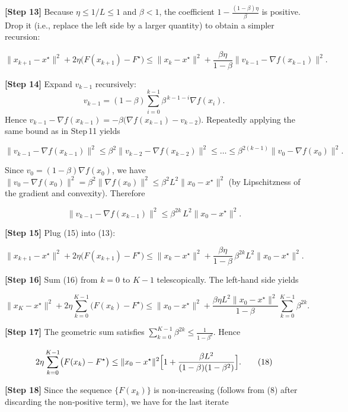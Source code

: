 \documentclass{article}
\begin{document}
\noindent\textbf{[Step 13]}  Because $\eta\le 1/L\le 1$ and $\beta<1$, the coefficient
$1-\frac{(1-\beta)\eta}{\beta}$ is positive.  Drop it (i.e., replace the left side by a larger quantity) to obtain a simpler recursion:

\[
\|x_{k+1}-x^\star\|^{2}+2\eta\bigl(F(x_{k+1})-F^\star\bigr)
\le \|x_k-x^\star\|^{2}
   +\frac{\beta\eta}{1-\beta}\|v_{k-1}-\nabla f(x_{k-1})\|^{2}.
\tag{13}
\]

\noindent\textbf{[Step 14]}  Expand $v_{k-1}$ recursively:
\[
v_{k-1}= (1-\beta)\sum_{i=0}^{k-1}\beta^{\,k-1-i}\nabla f(x_i).
\]
Hence $v_{k-1}-\nabla f(x_{k-1}) = -\beta\bigl(\nabla f(x_{k-1})-v_{k-2}\bigr)$.
Repeatedly applying the same bound as in Step 11 yields

\[
\|v_{k-1}-\nabla f(x_{k-1})\|^{2}
\le \beta^{2}\|v_{k-2}-\nabla f(x_{k-2})\|^{2}
\le \dots \le \beta^{2(k-1)}\|v_{0}-\nabla f(x_{0})\|^{2}.
\tag{14}
\]

Since $v_{0}=(1-\beta)\nabla f(x_{0})$, we have $\|v_{0}-\nabla f(x_{0})\|^{2}
= \beta^{2}\|\nabla f(x_{0})\|^{2}\le \beta^{2}L^{2}\|x_{0}-x^\star\|^{2}$ (by Lipschitzness of the gradient and convexity).  Therefore

\[
\|v_{k-1}-\nabla f(x_{k-1})\|^{2}\le \beta^{2k}\,L^{2}\|x_{0}-x^\star\|^{2}.
\tag{15}
\]

\noindent\textbf{[Step 15]}  Plug (15) into (13):

\[
\|x_{k+1}-x^\star\|^{2}+2\eta\bigl(F(x_{k+1})-F^\star\bigr)
\le \|x_k-x^\star\|^{2}
   +\frac{\beta\eta}{1-\beta}\,\beta^{2k}L^{2}\|x_{0}-x^\star\|^{2}.
\tag{16}
\]

\noindent\textbf{[Step 16]}  Sum (16) from $k=0$ to $K-1$ telescopically.  
The left‑hand side yields

\[
\|x_{K}-x^\star\|^{2}+2\eta\sum_{k=0}^{K-1}\bigl(F(x_{k})-F^\star\bigr)
\le \|x_{0}-x^\star\|^{2}
   +\frac{\beta\eta L^{2}\|x_{0}-x^\star\|^{2}}{1-\beta}
      \sum_{k=0}^{K-1}\beta^{2k}.
\tag{17}
\]

\noindent\textbf{[Step 17]}  The geometric sum satisfies $\sum_{k=0}^{K-1}\beta^{2k}\le
\frac{1}{1-\beta^{2}}$.  Hence

\[
2\eta\sum_{k=0}^{K-1}\bigl(F(x_{k})-F^\star\bigr)
\le \|x_{0}-x^\star\|^{2}
   \Bigl[1+\frac{\beta L^{2}}{(1-\beta)(1-\beta^{2})}\Bigr].
\tag{18}
\]

\noindent\textbf{[Step 18]}  Since the sequence $\{F(x_k)\}$ is non‑increasing (follows from (8) after discarding the non‑positive term), we have for the last iterate  
\end{document}
